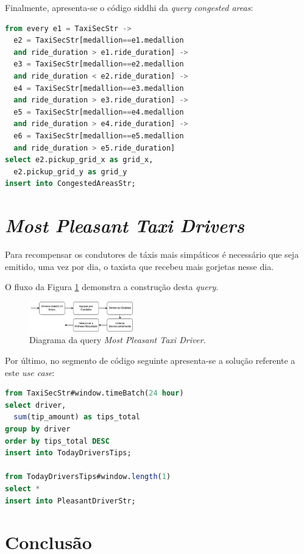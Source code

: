 \documentclass[article]{IEEEtran}
\begin{document}
Finalmente, apresenta-se o código siddhi da \textit{query} \textit{congested areas}:

\begin{lstlisting}[language=SQL]
from every e1 = TaxiSecStr ->
  e2 = TaxiSecStr[medallion==e1.medallion
  and ride_duration > e1.ride_duration] ->
  e3 = TaxiSecStr[medallion==e2.medallion
  and ride_duration < e2.ride_duration] ->
  e4 = TaxiSecStr[medallion==e3.medallion
  and ride_duration > e3.ride_duration] ->
  e5 = TaxiSecStr[medallion==e4.medallion
  and ride_duration > e4.ride_duration] ->
  e6 = TaxiSecStr[medallion==e5.medallion
  and ride_duration > e5.ride_duration]
select e2.pickup_grid_x as grid_x,
  e2.pickup_grid_y as grid_y
insert into CongestedAreasStr;
\end{lstlisting}



\section{\textit{Most Pleasant Taxi Drivers}}

Para recompensar os condutores de táxis mais simpáticos é necessário que seja emitido, uma vez por dia, o taxista que recebeu mais gorjetas nesse dia.

O fluxo da Figura \ref{fig:pleasantDriverDiagram} demonstra a construção desta \textit{query}.

\begin{figure}[hbtp]
    \centering
        \includegraphics[width=0.4\textwidth]{images/pleasantDriver}
    \caption{Diagrama da query \textit{Most Pleasant Taxi Driver}.}
    \label{fig:pleasantDriverDiagram}
\end{figure}

Por último, no segmento de código seguinte apresenta-se a solução referente a este \textit{use case}:

\begin{lstlisting}[language=SQL]
from TaxiSecStr#window.timeBatch(24 hour)
select driver, 
  sum(tip_amount) as tips_total
group by driver
order by tips_total DESC
insert into TodayDriversTips;

from TodayDriversTips#window.length(1)
select *
insert into PleasantDriverStr;
\end{lstlisting}

\section{Conclusão} 





\end{document}
